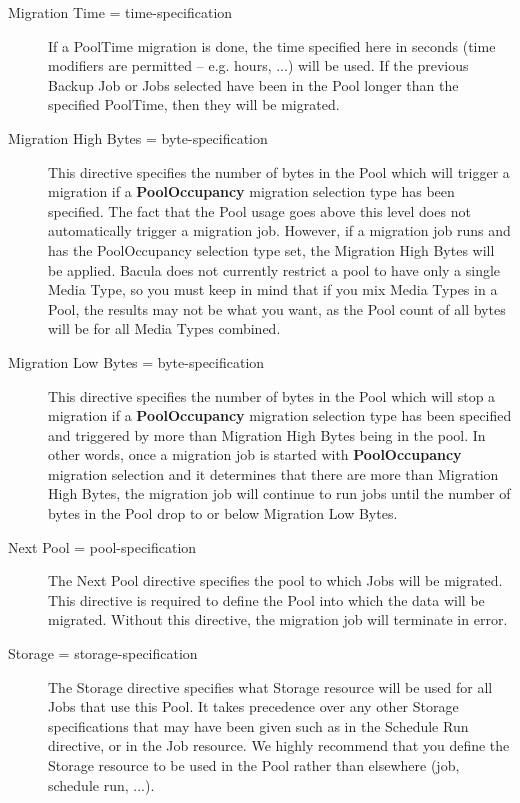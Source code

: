 \begin{description}
\item [Migration Time = \lt{}time-specification\gt{}]
   If a PoolTime migration is done, the time specified here in seconds (time
   modifiers are permitted -- e.g. hours, ...) will be used. If the     
   previous Backup Job or Jobs selected have been in the Pool longer than
   the specified PoolTime, then they will be migrated.

\item [Migration High Bytes =  \lt{}byte-specification\gt{}]
   This directive specifies the number of bytes in the Pool which will
   trigger a migration if a {\bf PoolOccupancy} migration selection
   type has been specified. The fact that the Pool
   usage goes above this level does not automatically trigger a migration
   job. However, if a migration job runs and has the PoolOccupancy selection 
   type set, the Migration High Bytes will be applied.  Bacula does not
   currently restrict a pool to have only a single Media Type, so you
   must keep in mind that if you mix Media Types in a Pool, the results
   may not be what you want, as the Pool count of all bytes will be
   for all Media Types combined.

\item [Migration Low Bytes = \lt{}byte-specification\gt{}]
   This directive specifies the number of bytes in the Pool which will
   stop a migration if a {\bf PoolOccupancy} migration selection
   type has been specified and triggered by more than Migration High
   Bytes being in the pool. In other words, once a migration job 
   is started with {\bf PoolOccupancy} migration selection and it
   determines that there are more than Migration High Bytes, the    
   migration job will continue to run jobs until the number of
   bytes in the Pool drop to or below Migration Low Bytes.

\item [Next Pool = \lt{}pool-specification\gt{}]
   The Next Pool directive specifies the pool to which Jobs will be
   migrated. This directive is required to define the Pool into which
   the data will be migrated. Without this directive, the migration job
   will terminate in error.

\item [Storage = \lt{}storage-specification\gt{}]
   The Storage directive specifies what Storage resource will be used
   for all Jobs that use this Pool. It takes precedence over any other
   Storage specifications that may have been given such as in the 
   Schedule Run directive, or in the Job resource.  We highly recommend
   that you define the Storage resource to be used in the Pool rather
   than elsewhere (job, schedule run, ...).
\end{description}

